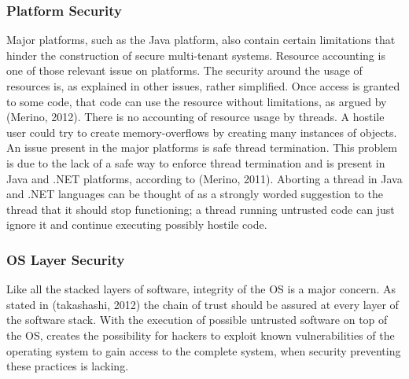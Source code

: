 \subsubsection{Platform Security}
Major platforms, such as the Java platform, also contain certain limitations that hinder the construction of secure multi-tenant systems. Resource accounting is one of those relevant issue on platforms. The security around the usage of resources is, as explained in other issues, rather simplified. Once access is granted to some code, that code can use the resource without limitations, as argued by (Merino, 2012). There is no accounting of resource usage by threads. A hostile user could try to create memory-overflows by creating many instances of objects.
An issue present in the major platforms is safe thread termination. This problem is due to the lack of a safe way to enforce thread termination and is present in Java and .NET platforms, according to (Merino, 2011). Aborting a thread in Java and .NET languages can be thought of as a strongly worded suggestion to the thread that it should stop functioning; a thread running untrusted code can just ignore it and continue executing possibly hostile code.\\

\subsubsection{OS Layer Security}
Like all the stacked layers of software, integrity of the OS is a major concern. As stated in (takashashi, 2012) the chain of trust should be assured at every layer of the software stack. With the execution of possible untrusted software on top of the OS, creates the possibility for hackers to exploit known vulnerabilities of the operating system to gain access to the complete system, when security preventing these practices is lacking.\\


